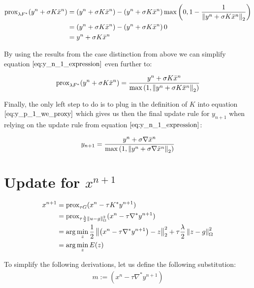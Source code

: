 \begin{itemize}
		\begin{align}
			\text{prox}_{\lambda F^*}(y^n + \sigma K \bar{x}^{n})
			&= (y^n + \sigma K \bar{x}^{n}) - \left( y^n + \sigma K \bar{x}^{n} \right) \max{\left(0, 1-\frac{1}{\left\lVert y^n + \sigma K \bar{x}^{n} \right\rVert_2}\right)} \nonumber \\
			&= (y^n + \sigma K \bar{x}^{n}) - \left( y^n + \sigma K \bar{x}^{n} \right) 0 \nonumber \\
			&= y^n + \sigma K \bar{x}^{n}
		\end{align}
\end{itemize}

By using the results from the case distinction from above we can simplify equation $\ref{eq:y_n_1_expression}$ even further to:

\begin{equation}
	\text{prox}_{\lambda F^*}(y^n + \sigma K \bar{x}^{n}) = \frac{y^n + \sigma K \bar{x}^{n}}{\max{\left(1,\left\lVert y^n + \sigma K \bar{x}^{n}\right\rVert_2 \right)}}
\label{eq:y_p_1_we_proxy}	
\end{equation}

Finally, the only left step to do is to plug in the definition of $K$ into equation $\ref{eq:y_p_1_we_proxy}$ which gives us then the final update rule for $y_{n+1}$ when relying on the update rule from equation $\ref{eq:y_n_1_expression}$:

\begin{align}
	y_{n+1} = \frac{y^n + \sigma \nabla \bar{x}^{n}}{\max{\left(1,\left\lVert y^n + \sigma \nabla \bar{x}^{n}\right\rVert_2 \right)}}
\label{eq:update_rule_y_n_p_1}	
\end{align} 	

\section{Update for $x^{n+1}$}

\begin{align}
x^{n+1} &= \text{prox}_{\tau G}(x^n - \tau K^* y^{n+1}) \\
		&= \text{prox}_{\tau \frac{\lambda}{2} \left\lVert u - g\right\rVert_{\Omega}^2 }(x^n - \tau \nabla^* y^{n+1}) \\
	    &= \arg \min_{z} \frac{1}{2} \left\lVert\left(x^n - \tau \nabla^* y^{n+1} \right) - z\right\rVert_2^2 + \tau \frac{\lambda}{2}\left\lVert z - g\right\rVert_{\Omega}^2 \\
	    &= \arg \min_{z} E(z)
\label{eq:energy_x_p_1}	    
\end{align}

To simplify the following derivations, let us define the following substitution: 
\begin{align}
	m := \left(x^n - \tau \nabla^* y^{n+1} \right)
\end{align}

